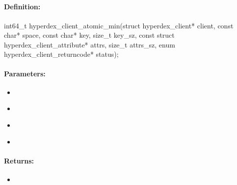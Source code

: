 \pagebreak
\subsection{}
\label{api:c:atomic_min}


\paragraph{Definition:}
\begin{ccode}
int64_t hyperdex_client_atomic_min(struct hyperdex_client* client,
        const char* space,
        const char* key, size_t key_sz,
        const struct hyperdex_client_attribute* attrs, size_t attrs_sz,
        enum hyperdex_client_returncode* status);
\end{ccode}

\paragraph{Parameters:}
\begin{itemize}[noitemsep]
\item {}\\

\item {}\\

\item {}\\

\item {}\\

\end{itemize}

\paragraph{Returns:}
\begin{itemize}[noitemsep]
\item {}\\

\end{itemize}

